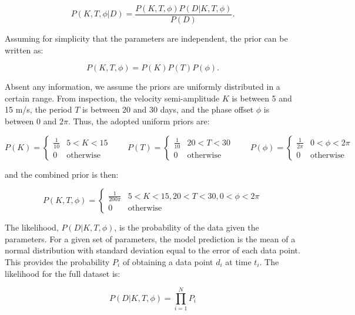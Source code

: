 \documentclass[preprint,longauthor]{aastex631}
\numberwithin{equation}{section}
\begin{document}
\begin{equation}
  P(K,T,\phi|D) = \frac{P(K,T,\phi)P(D|K,T,\phi)}{P(D)}.
\end{equation}

Assuming for simplicity that the parameters are independent, the prior can be written as:

\begin{equation}
  P(K,T,\phi) = P(K)P(T)P(\phi).
\end{equation}

Absent any information, we assume the priors are uniformly distributed in a certain range. From inspection, the velocity semi-amplitude $K$ is between 5 and 15 m/s, the period $T$ is between 20 and 30 days, and the phase offset $\phi$ is between 0 and $2\pi$. Thus, the adopted uniform priors are:

\begin{equation*}
  P(K) = \begin{cases}
    \frac{1}{10} & 5 < K < 15 \\
    0 & \text{otherwise}
  \end{cases} \qquad
  P(T) = \begin{cases}
    \frac{1}{10} & 20 < T < 30 \\
    0 & \text{otherwise}
  \end{cases} \qquad
  P(\phi) = \begin{cases}
    \frac{1}{2\pi} & 0 < \phi < 2\pi \\
    0 & \text{otherwise}
  \end{cases}
\end{equation*}

and the combined prior is then:

\begin{equation}
  P(K,T,\phi) = \begin{cases}
    \frac{1}{200\pi} & 5 < K < 15, 20 < T < 30, 0 < \phi < 2\pi \\
    0 & \text{otherwise}
  \end{cases}
\end{equation}

The likelihood, $P(D|K,T,\phi)$, is the probability of the data given the parameters. For a given set of parameters, the model prediction is the mean of a normal distribution with standard deviation equal to the error of each data point. This provides the probability $P_i$ of obtaining a data point $d_i$ at time $t_i$. The likelihood for the full dataset is:

\begin{equation}
  P(D|K,T,\phi) = \prod_{i=1}^{N} P_i
\end{equation}
\end{document}
